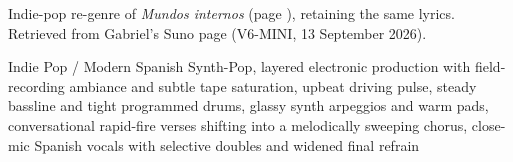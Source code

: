 
\begin{notes}
Indie-pop re-genre of \emph{Mundos internos} (page \pageref{sec:mundos-internos}), retaining the same lyrics. Retrieved from Gabriel's Suno page (V6-MINI, 13 September 2026).
\end{notes}
\begin{style}
Indie Pop / Modern Spanish Synth-Pop, layered electronic production with field-recording ambiance and subtle tape saturation, upbeat driving pulse, steady bassline and tight programmed drums, glassy synth arpeggios and warm pads, conversational rapid-fire verses shifting into a melodically sweeping chorus, close-mic Spanish vocals with selective doubles and widened final refrain
\end{style}
